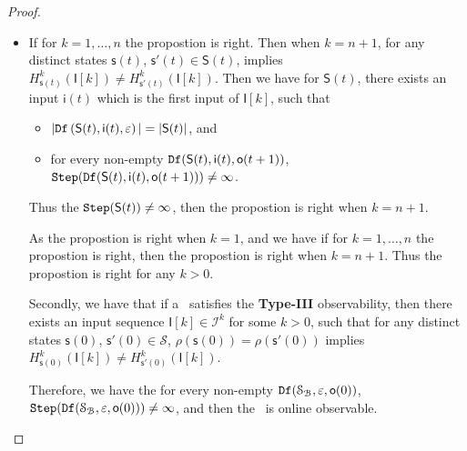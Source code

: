 \begin{appendices}
\begin{proof}
\begin{itemize}
\item If for $k=1,\ldots, n$ the propostion is right. Then when $k=n+1$, for any distinct states $\mathsf{s}(t)$, $\mathsf{s}'(t) \in \mathsf{S}(t)$, implies $H^{k}_{\mathsf{s}(t)}(\mathsf{I}[k])\neq H^{k}_{\mathsf{s}'(t)}(\mathsf{I}[k])$. Then we have for $\mathsf{S}(t)$,
 there exists an input $\mathsf{i}(t)$ which is the first input of $\mathsf{I}[k]$, such that
 \begin{itemize}
\item  $|{\tt Df}\left(\mathsf{S}(t),\mathsf{i}(t),\varepsilon\right)|=|\mathsf{S}(t)|$, and 
 \item  for every non-empty ${\tt Df}(\mathsf{S}(t),\mathsf{i}(t),\mathsf{o}(t+1))$, ${\tt Step}({\tt Df}(\mathsf{S}(t),\mathsf{i}(t),\mathsf{o}(t+1)))\ne \infty$.
 \end{itemize}
Thus the ${\tt Step}(\mathsf{S}(t))\ne \infty$, then the propostion is right when $k =n+1$.

As the propostion is right when $k =1$, and we have if for $k=1,\ldots, n$ the propostion is right, then the propostion is right when $k=n+1$. Thus the propostion is right for any $k>0$.

Secondly, we have that if a \BCN\ satisfies the {\bf Type-III} observability, then there exists an input sequence $\mathsf{I}[k]\in\mathcal{I}^{k}$ for some $k >0$, such that for any distinct states $\mathsf{s}(0)$, $\mathsf{s}'(0) \in \mathcal{S}$, $\rho(\mathsf{s}(0))=\rho(\mathsf{s}'(0))$ implies $H^{k}_{\mathsf{s}(0)}(\mathsf{I}[k])\neq H^{k}_{\mathsf{s}'(0)}(\mathsf{I}[k])$. 

Therefore, we have the for every non-empty ${\tt Df}(\mathcal{S}_{\mathcal{B}},\varepsilon, \mathsf{o}(0))$, ${\tt Step}({\tt Df}(\mathcal{S}_{\mathcal{B}},\varepsilon,\mathsf{o}(0)))\ne \infty$, and then the \BCN\ is online observable.
 \end{itemize}
\end{proof}

\end{appendices}
